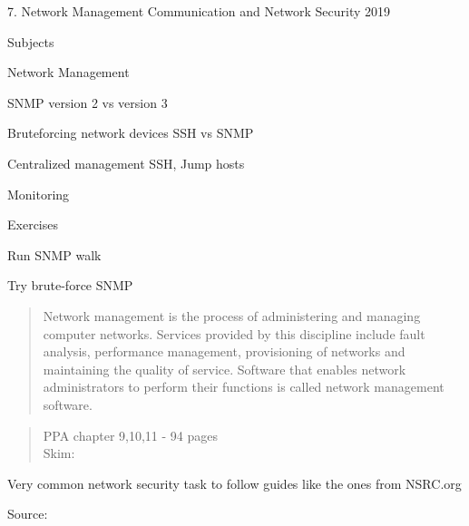 \documentclass[Screen16to9,17pt]{foils}
\begin{document}
\mytitlepage
{7. Network Management}
{Communication and Network Security 2019}




\begin{list1}
\item Subjects
\begin{list2}
\item Network Management
\item SNMP version 2 vs version 3
\item Bruteforcing network devices SSH vs SNMP
\item Centralized management SSH, Jump hosts
\item Monitoring
\end{list2}
\item Exercises
\begin{list2}
\item Run SNMP walk
\item Try brute-force SNMP
\end{list2}
\end{list1}



\begin{quote}
Network management is the process of administering and managing computer networks. Services provided by this discipline include fault analysis, performance management, provisioning of networks and maintaining the quality of service. Software that enables network administrators to perform their functions is called network management software.\\
\end{quote}

\begin{quote}
PPA chapter 9,10,11 - 94 pages\\
Skim:\\
\end{quote}

Very common network security task to follow guides like the ones from NSRC.org



Source:
\end{document}
